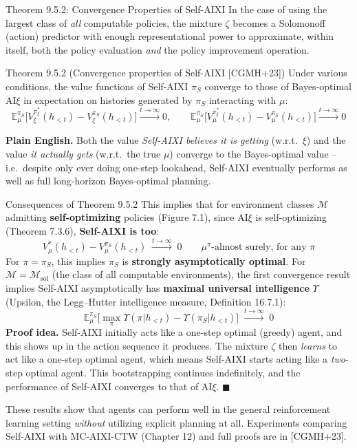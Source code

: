 \documentclass[aspectratio=169,10pt]{beamer}
\newcommand{\E}{\mathbb{E}}
\begin{document}
\begin{frame}{Theorem 9.5.2: Convergence Properties of Self-AIXI}
  In the case of using the largest class of \emph{all} computable
  policies, the mixture $\zeta$ becomes a Solomonoff (action) predictor
  with enough representational power to approximate, within itself, both
  the policy evaluation \emph{and} the policy improvement operation.

  \begin{block}{Theorem 9.5.2 (Convergence properties of Self-AIXI [CGMH+23])}
    Under various conditions, the value functions of Self-AIXI $\pi_S$
    converge to those of Bayes-optimal $\mathrm{AI}\xi$ in expectation on
    histories generated by $\pi_S$ interacting with $\mu$:
    \[
      \E^{\pi_S}_\mu\big[V^{\pi_\xi^*}_\xi(h_{<t}) - V^{\pi_S}_\xi(h_{<t})\big] \xrightarrow{t\to\infty} 0,
      \qquad
      \E^{\pi_S}_\mu\big[V^{\pi_\xi^*}_\mu(h_{<t}) - V^{\pi_S}_\mu(h_{<t})\big] \xrightarrow{t\to\infty} 0
    \]
  \end{block}
  \textbf{Plain English.} Both the value \emph{Self-AIXI believes it is
  getting} (w.r.t.\ $\xi$) and the value \emph{it actually gets} (w.r.t.\
  the true $\mu$) converge to the Bayes-optimal value -- i.e.\ despite
  only ever doing one-step lookahead, Self-AIXI eventually performs as
  well as full long-horizon Bayes-optimal planning.
\end{frame}

\begin{frame}{Consequences of Theorem 9.5.2}
  This implies that for environment classes $\mathcal{M}$ admitting
  \textbf{self-optimizing} policies (Figure 7.1), since
  $\mathrm{AI}\xi$ is self-optimizing (Theorem 7.3.6), \textbf{Self-AIXI is
  too}:
  \[
    V^*_\mu(h_{<t}) - V^{\pi_S}_\mu(h_{<t}) \;\xrightarrow{t\to\infty}\; 0 \qquad \mu^\pi\text{-almost surely, for any } \pi
  \]
  For $\pi=\pi_S$, this implies $\pi_S$ is \textbf{strongly asymptotically
  optimal}. For $\mathcal{M}=\mathcal{M}_{\mathrm{sol}}$ (the class of all
  computable environments), the first convergence result implies
  Self-AIXI asymptotically has \textbf{maximal universal intelligence}
  $\Upsilon$ (Upsilon, the Legg--Hutter intelligence measure,
  Definition 16.7.1):
  \[
    \E^{\pi_S}_\mu\Big[\max_\pi \Upsilon(\pi|h_{<t}) - \Upsilon(\pi_S|h_{<t})\Big] \;\xrightarrow{t\to\infty}\; 0
  \]
  \textbf{Proof idea.} Self-AIXI initially acts like a one-step optimal
  (greedy) agent, and this shows up in the action sequence it produces.
  The mixture $\zeta$ then \emph{learns} to act like a one-step optimal
  agent, which means Self-AIXI starts acting like a \emph{two}-step
  optimal agent. This bootstrapping continues indefinitely, and the
  performance of Self-AIXI converges to that of $\mathrm{AI}\xi$.
  $\blacksquare$

  \vspace{0.4em}
  These results show that agents can perform well in the general
  reinforcement learning setting \emph{without} utilizing explicit
  planning at all. Experiments comparing Self-AIXI with MC-AIXI-CTW
  (Chapter 12) and full proofs are in [CGMH+23].
\end{frame}
\end{document}
